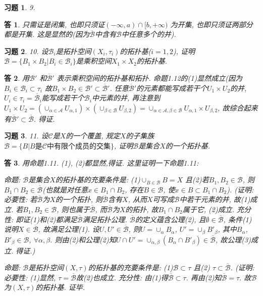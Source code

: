 \documentclass{ctexart}%
\newtheorem*{exercise}{习题}
\newtheorem*{solution}{答}
\theoremstyle{definition}
\theoremstyle{remark}
\begin{document}
\begin{exercise}9.
\end{exercise}
\begin{solution}只需证是闭集, 也即只须证$(-\infty, a)\cap [b,+\infty)$ 为开集, 也即只须证两部分都是开集. 这是显然的(因为$\overline{\mathscr{B}}$中含有$\mathscr{B}$中任意多个的并). 
\end{solution}

\begin{exercise}10. 设$\mathscr{B}_i$是拓扑空间$(X_i,\tau_i)$的拓扑基($i=1,2$), 证明$\mathscr{B}=\{B_1\times B_2|B_i\in \mathscr{B}_i\}$是乘积空间$X_1\times X_2$的拓扑基. 
\end{exercise}
\begin{solution} 用$\mathscr{B}'$ 和$\overline{\mathscr{B}}'$ 表示乘积空间的拓扑基和拓扑. 命题1.12的(1)显然成立(因为$B_i\in \mathscr{B}_i\subset \tau_i$ 故$B_1\times B_2\in\mathscr{B}'\subset \overline{\mathscr{B}}'$. 任意$\overline{\mathscr{B}}'$的元素都能写成若干个$U_1\times U_2$的并, $U_i\in \tau_i=\overline{\mathscr{B}}_i$能写成若干个$\mathscr{B}_i$中元素的并, 再注意到$U_1\times U_2
=(\cup_{\alpha\in \mathscr{A}} U_{\alpha,1})\times(\cup_{\beta\in\mathscr{B}} U_{\beta,2})
=\cup_{\alpha\in\mathscr{A},\beta\in\mathscr{B}}U_{\alpha,1}\times U_{\beta,2}$, 
故综合起来有$\overline{\mathscr{B}}'\subset \overline{\mathscr{B}}$. 得证. 
\end{solution}

\begin{exercise}11. 设$\mathscr{C}$是$X$的一个覆盖, 规定$X$的子集族$\mathscr{B}=\{B|B\text{是}\mathscr{C}\text{中有限个成员的交集}\}$, 证明$\mathscr{B}$是集合$X$的一个拓扑基.
\end{exercise}
\begin{solution}用命题1.11. (1), (2)都显然,得证. 这里证明一下命题1.11: 

命题: $\mathscr{B}$是集合$X$的拓扑基的充要条件是: (1)$\cup_{B\in \mathscr{B}}B=X$ 且(2)若$B_1,B_2\in \mathscr{B}$, 则$B_1\cap B_2\in \overline{\mathscr{B}}$(也就是对任意$x\in B_1\cap B_2$, 存在$B\in \mathscr{B}$, 使$x\in B\subset B_1\cap B_2$). (证明: 必要性: 若$\overline{\mathscr{B}}$为$X$的一个拓扑, 则$\overline{\mathscr{B}}$含有$X$, 从而$X$可写成$\mathscr{B}$中若干元素的并, 故(1)成立. 若$B_1, B_2\in \mathscr{B}$, 则也属于$\overline{\mathscr{B}}$, 而$\overline{\mathscr{B}}$为$X$的拓扑, 故$B_1\cap B_2$属于它, (2)成立. 充分性: 即证(1)和(2)都满足$\overline{\mathscr{B}}$满足拓扑公理. $\overline{\mathscr{B}}$的定义蕴含公理(2), 且$\emptyset \in \overline{\mathscr{B}}$, 条件(1)说明$X\in \overline{\mathscr{B}}$, 故满足公理(1). 设$U, U'\in \overline{\mathscr{B}}$, 则$U=\cup_\alpha B_\alpha$, $U'= \cup_\beta B'_{\beta}$, 其中$B_\alpha$, $B'_\beta\in \mathscr{B}$, $\forall \alpha,\beta$. 则由(2)和公理(2)知$U\cap U'=\cup_{\alpha,\beta}(B_\alpha \cap B'_\beta) \in \overline{\mathscr{B}}$, 故公理(3)成立. 得证.)

命题: $\mathscr{B}$是拓扑空间$(X,\tau)$的拓扑基的充要条件是: (1)$\mathscr{B}\subset \tau$ 且(2) $\tau\subset \overline{\mathscr{B}}$. (证明: 必要性: (1)显然, $\tau=\overline{\mathscr{B}}$故(2)也成立. 充分性: 由(1)得$\overline{\mathscr{B}}\subset \tau$. 再由(2)知$\overline{\mathscr{B}}=\tau$. 故$\mathscr{B}$为$(X,\tau)$的拓扑基. 证毕. 
\end{solution}
\end{document}
